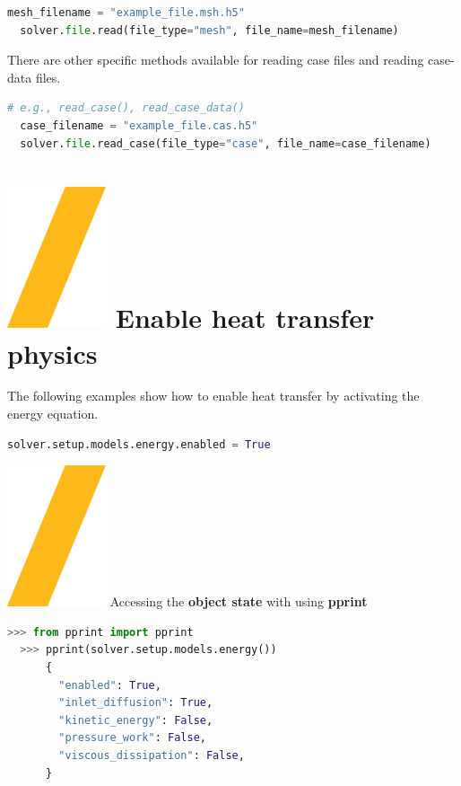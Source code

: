 \documentclass[9pt,landscape]{article}
\begin{document}
\begin{multicols}{3}
\begin{lstlisting}[language=Python]
  mesh_filename = "example_file.msh.h5"
  solver.file.read(file_type="mesh", file_name=mesh_filename)
\end{lstlisting}

There are other specific methods available for reading case files and
reading case-data files. 

\begin{lstlisting}[language=Python]
  # e.g., read_case(), read_case_data()
  case_filename = "example_file.cas.h5"
  solver.file.read_case(file_type="case", file_name=case_filename)
\end{lstlisting}


\section{\includegraphics[height=\fontcharht\font`\S]{slash.png} Enable heat transfer physics}

The following examples show how to enable heat transfer by activating the energy equation.

\begin{lstlisting}[language=Python]
  solver.setup.models.energy.enabled = True
\end{lstlisting}

{\includegraphics[height=\fontcharht\font`\S]{slash.png} Accessing the \textbf{object state} with using \textbf{pprint}

\begin{lstlisting}[language=Python]
  >>> from pprint import pprint
  >>> pprint(solver.setup.models.energy())
      {
        "enabled": True,
        "inlet_diffusion": True,
        "kinetic_energy": False,
        "pressure_work": False,
        "viscous_dissipation": False,
      }
\end{lstlisting}


}
\end{multicols}
\end{document}
